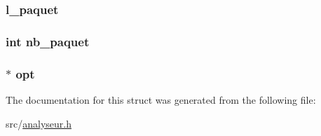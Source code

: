 \subsubsection[{\texorpdfstring{l\+\_\+paquet}{l_paquet}}]{ l\+\_\+paquet}\hypertarget{struct_user_ad3b02cc08546fd807de16745eb9fc0ef}{}\label{struct_user_ad3b02cc08546fd807de16745eb9fc0ef}
\subsubsection[{\texorpdfstring{nb\+\_\+paquet}{nb_paquet}}]{\setlength{\rightskip}{0pt plus 5cm}int nb\+\_\+paquet}\hypertarget{struct_user_ac5d5fb856fd497fae6e967afd55bfab2}{}\label{struct_user_ac5d5fb856fd497fae6e967afd55bfab2}
\subsubsection[{\texorpdfstring{opt}{opt}}]{$\ast$ opt}\hypertarget{struct_user_abf0b5d238619365cb08656c04e77bd28}{}\label{struct_user_abf0b5d238619365cb08656c04e77bd28}


The documentation for this struct was generated from the following file\+:\begin{DoxyCompactItemize}
\item 
src/\hyperlink{analyseur_8h}{analyseur.\+h}\end{DoxyCompactItemize}

